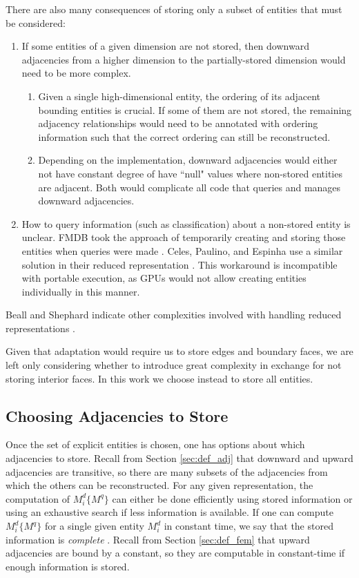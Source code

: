 There are also many consequences of storing only a subset of entities that
must be considered:
\begin{enumerate}
\item If some entities of a given dimension are not stored, then
downward adjacencies from a higher dimension to the partially-stored dimension
would need to be more complex.
\begin{enumerate}
\item Given a single high-dimensional entity, the ordering of its
adjacent bounding entities is crucial.
If some of them are not stored, the remaining adjacency relationships
would need to be annotated with ordering information such that the correct
ordering can still be reconstructed.
\item Depending on the implementation, downward adjacencies would either
not have constant degree of have ``null" values where non-stored entities
are adjacent.
Both would complicate all code that queries and manages
downward adjacencies.
\end{enumerate}
\item How to query information (such as classification) about a non-stored
entity is unclear. FMDB took the approach of temporarily creating
and storing those entities when queries were made \cite{seol2005fmdb}.
Celes, Paulino, and Espinha use a similar solution in their reduced
representation \cite{celes2005compact}.
This workaround is incompatible with portable execution, as GPUs
would not allow creating entities individually in this manner.
\end{enumerate}
Beall and Shephard indicate other complexities involved
with handling reduced representations \cite{beall1997general}.

Given that adaptation would require us to store edges and boundary
faces, we are left only considering whether to introduce great
complexity in exchange for not storing interior faces.
In this work we choose instead to store all entities.

\subsection{Choosing Adjacencies to Store}

Once the set of explicit entities is chosen, one has
options about which adjacencies to store.
Recall from Section \ref{sec:def_adj} that downward and upward
adjacencies are transitive, so there are many
subsets of the adjacencies from which the others
can be reconstructed.
For any given representation, the computation of $M^d_i\{M^q\}$
can either be done efficiently using stored information
or using an exhaustive search if less information is available.
If one can compute $M^d_i\{M^q\}$ for a single
given entity $M^d_i$ in constant time,
we say that the stored information is {\it complete} \cite{seol2006efficient}.
Recall from Section \ref{sec:def_fem} that upward adjacencies
are bound by a constant, so they are computable in
constant-time if enough information is stored.

